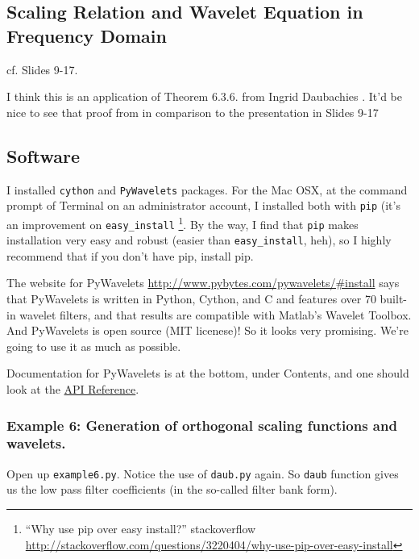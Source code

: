 \documentclass[twoside]{amsart}
\theoremstyle{plain}
\theoremstyle{definition}
\theoremstyle{remark}
\numberwithin{equation}{section}
\begin{document}
\subsection*{Scaling Relation and Wavelet Equation in Frequency Domain}
cf. Slides 9-17. \cite{GStrangKAmaratunga2003}

I think this is an application of Theorem 6.3.6. from Ingrid Daubachies \cite{IDaubechies1992}.  It'd be nice to see that proof from \cite{IDaubechies1992} in comparison to the presentation in Slides 9-17 \cite{GStrangKAmaratunga2003}

\subsection*{Software} 

I installed \verb|cython| and \verb|PyWavelets| packages.  For the Mac OSX, at the command prompt of Terminal on an administrator account, I installed both with \verb|pip| (it's an improvement on \verb|easy_install| \footnote{``Why use pip over easy install?'' stackoverflow \url{http://stackoverflow.com/questions/3220404/why-use-pip-over-easy-install}}.  By the way, I find that \verb|pip| makes installation very easy and robust (easier than \verb|easy_install|, heh), so I highly recommend that if you don't have pip, install pip.   


The website for PyWavelets \url{http://www.pybytes.com/pywavelets/#install} says that PyWavelets is written in Python, Cython, and C and features over 70 built-in wavelet filters, and that results are compatible with Matlab's Wavelet Toolbox.  And PyWavelets is open source (MIT licenese)! So it looks very promising.  We're going to use it as much as possible.  

Documentation for PyWavelets is at the bottom, under Contents, and one should look at the \href{http://www.pybytes.com/pywavelets/ref/index.html}{API Reference}.  

\subsubsection*{Example 6: Generation of orthogonal scaling functions and wavelets.}

Open up \verb|example6.py|.  Notice the use of \verb|daub.py| again.  So \verb|daub| function gives us the low pass filter coefficients (in the so-called filter bank form).  
\end{document}

